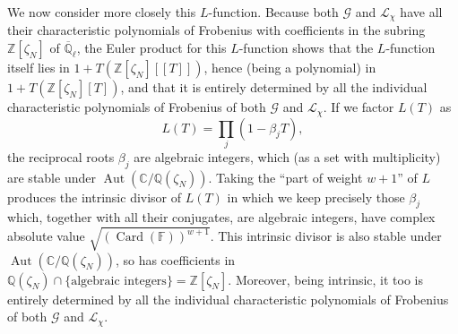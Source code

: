 We now consider more closely this \(L\)-function. Because both \(\mathcal{G}\)
and \(\mathcal{L}_\chi\) have all their characteristic polynomials of Frobenius
with coefficients in the subring \(\mathbb{Z}[\zeta_N]\) of
\(\overline{\mathbb{Q}}_\ell\), the Euler product for this \(L\)-function shows
that the \(L\)-function itself lies in \(1+T(\mathbb{Z}[\zeta_N][[T]])\),
hence (being a polynomial) in \(1+T(\mathbb{Z}[\zeta_N][T])\), and that it is
entirely determined by all the individual characteristic polynomials of
Frobenius of both \(\mathcal{G}\) and \(\mathcal{L}_\chi\). If we factor
\(L(T)\) as
\[
  L(T)=\prod_j(1-\beta_jT),
\]
the reciprocal roots \(\beta_j\) are algebraic integers, which (as a set with
multiplicity) are stable under \(\operatorname{Aut}(\mathbb{C}/\mathbb{Q}(\zeta_N))\).
Taking the ``part of weight \(w+1\)'' of \(L\) produces the intrinsic divisor
of \(L(T)\) in which we keep precisely those \(\beta_j\) which, together with
all their conjugates, are algebraic integers, have complex absolute value
\(\sqrt{(\operatorname{Card}(\mathbb{F}))^{w+1}}\). This intrinsic divisor is
also stable under \(\operatorname{Aut}(\mathbb{C}/\mathbb{Q}(\zeta_N))\), so
has coefficients in
\(\mathbb{Q}(\zeta_N)\cap\{\text{algebraic integers}\}=\mathbb{Z}[\zeta_N]\).
Moreover, being intrinsic, it too is entirely determined by all the individual
characteristic polynomials of Frobenius of both \(\mathcal{G}\) and
\(\mathcal{L}_\chi\).

